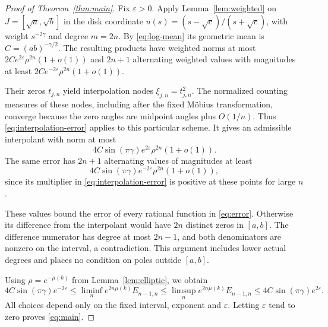 \documentclass[11pt]{article}
\begin{document}
\begin{proof}[Proof of Theorem~\ref{thm:main}]
Fix $\varepsilon>0$. Apply Lemma~\ref{lem:weighted} on
$J=[\sqrt a,\sqrt b]$ in the disk coordinate
$u(s)=(s-\sqrt c)/(s+\sqrt c)$, with weight $s^{-2\gamma}$ and
degree $m=2n$.
By \eqref{eq:log-mean} its geometric mean is
$C=(ab)^{-\gamma/2}$.
The resulting products have weighted norms at most
$2Ce^{2\varepsilon}\rho^{2n}(1+o(1))$ and $2n+1$ alternating weighted
values with magnitudes at least
$2Ce^{-2\varepsilon}\rho^{2n}(1+o(1))$.

Their zeros $t_{j,n}$ yield interpolation nodes $\xi_{j,n}=t_{j,n}^2$.
The normalized counting measures of these nodes, including after the fixed
M\"obius transformation, converge because the zero angles are midpoint
angles plus $O(1/n)$. Thus \eqref{eq:interpolation-error} applies to this
particular scheme. It gives an admissible interpolant with norm at most
\[
 4C\sin(\pi\gamma)e^{2\varepsilon}\rho^{2n}(1+o(1)).
\]
The same error has $2n+1$ alternating values of magnitudes at least
\[
 4C\sin(\pi\gamma)e^{-2\varepsilon}\rho^{2n}(1+o(1)),
\]
since its multiplier in \eqref{eq:interpolation-error} is positive at
these points for large $n$.

These values bound the error of every rational function in
\eqref{eq:error}. Otherwise its difference from the interpolant would
have $2n$ distinct zeros in $[a,b]$. The difference numerator has degree
at most $2n-1$, and both denominators are nonzero on the interval, a
contradiction. This argument includes lower actual degrees and places
no condition on poles outside $[a,b]$.

Using $\rho=e^{-\mu(k)}$ from Lemma~\ref{lem:elliptic}, we obtain
\[
 4C\sin(\pi\gamma)e^{-2\varepsilon}
 \le\liminf_n e^{2n\mu(k)}E_{n-1,n}
 \le\limsup_n e^{2n\mu(k)}E_{n-1,n}
 \le4C\sin(\pi\gamma)e^{2\varepsilon}.
\]
All choices depend only on the fixed interval, exponent and
$\varepsilon$. Letting $\varepsilon$ tend to zero proves
\eqref{eq:main}.
\end{proof}
\end{document}
